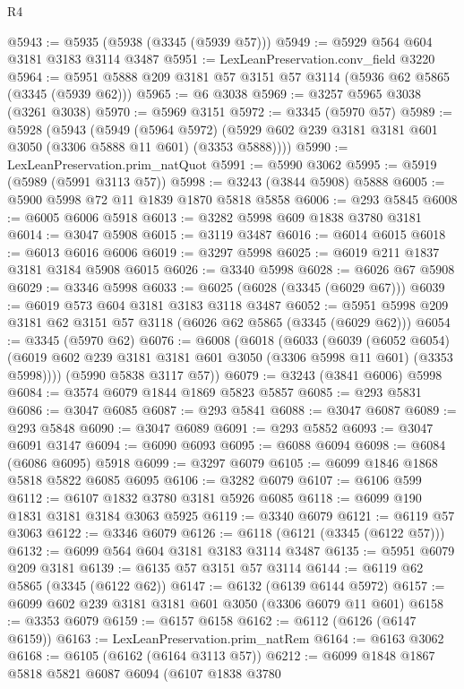 \begin{lexlean}{R4}
\begin{coremodule}
@5943 := @5935 (@5938 (@3345 (@5939 @57)))
@5949 := @5929 @564 @604 @3181 @3183 @3114 @3487
@5951 := LexLeanPreservation.conv_field @3220
@5964 := @5951 @5888 @209 @3181 @57 @3151 @57 @3114 (@5936 @62 @5865 (@3345 (@5939 @62)))
@5965 := @6 @3038
@5969 := @3257 @5965 @3038 (@3261 @3038)
@5970 := @5969 @3151
@5972 := @3345 (@5970 @57)
@5989 := @5928
    (@5943
      (@5949
        (@5964 @5972)
        (@5929 @602 @239 @3181 @3181 @601 @3050 (@3306 @5888 @11 @601) (@3353 @5888))))
@5990 := LexLeanPreservation.prim_natQuot
@5991 := @5990 @3062
@5995 := @5919 (@5989 (@5991 @3113 @57))
@5998 := @3243 (@3844 @5908) @5888
@6005 := @5900 @5998 @72 @11 @1839 @1870 @5818 @5858
@6006 := @293 @5845
@6008 := @6005 @6006 @5918
@6013 := @3282 @5998 @609 @1838 @3780 @3181
@6014 := @3047 @5908
@6015 := @3119 @3487
@6016 := @6014 @6015
@6018 := @6013 @6016 @6006
@6019 := @3297 @5998
@6025 := @6019 @211 @1837 @3181 @3184 @5908 @6015
@6026 := @3340 @5998
@6028 := @6026 @67 @5908
@6029 := @3346 @5998
@6033 := @6025 (@6028 (@3345 (@6029 @67)))
@6039 := @6019 @573 @604 @3181 @3183 @3118 @3487
@6052 := @5951 @5998 @209 @3181 @62 @3151 @57 @3118 (@6026 @62 @5865 (@3345 (@6029 @62)))
@6054 := @3345 (@5970 @62)
@6076 := @6008
    (@6018
      (@6033
        (@6039
          (@6052 @6054)
          (@6019 @602 @239 @3181 @3181 @601 @3050 (@3306 @5998 @11 @601) (@3353 @5998))))
      (@5990 @5838 @3117 @57))
@6079 := @3243 (@3841 @6006) @5998
@6084 := @3574 @6079 @1844 @1869 @5823 @5857
@6085 := @293 @5831
@6086 := @3047 @6085
@6087 := @293 @5841
@6088 := @3047 @6087
@6089 := @293 @5848
@6090 := @3047 @6089
@6091 := @293 @5852
@6093 := @3047 @6091 @3147
@6094 := @6090 @6093
@6095 := @6088 @6094
@6098 := @6084 (@6086 @6095) @5918
@6099 := @3297 @6079
@6105 := @6099 @1846 @1868 @5818 @5822 @6085 @6095
@6106 := @3282 @6079
@6107 := @6106 @599
@6112 := @6107 @1832 @3780 @3181 @5926 @6085
@6118 := @6099 @190 @1831 @3181 @3184 @3063 @5925
@6119 := @3340 @6079
@6121 := @6119 @57 @3063
@6122 := @3346 @6079
@6126 := @6118 (@6121 (@3345 (@6122 @57)))
@6132 := @6099 @564 @604 @3181 @3183 @3114 @3487
@6135 := @5951 @6079 @209 @3181
@6139 := @6135 @57 @3151 @57 @3114
@6144 := @6119 @62 @5865 (@3345 (@6122 @62))
@6147 := @6132 (@6139 @6144 @5972)
@6157 := @6099 @602 @239 @3181 @3181 @601 @3050 (@3306 @6079 @11 @601)
@6158 := @3353 @6079
@6159 := @6157 @6158
@6162 := @6112 (@6126 (@6147 @6159))
@6163 := LexLeanPreservation.prim_natRem
@6164 := @6163 @3062
@6168 := @6105 (@6162 (@6164 @3113 @57))
@6212 := @6099
    @1848
    @1867
    @5818
    @5821
    @6087
    @6094
    (@6107
      @1838
      @3780

\end{coremodule}
\end{lexlean}
